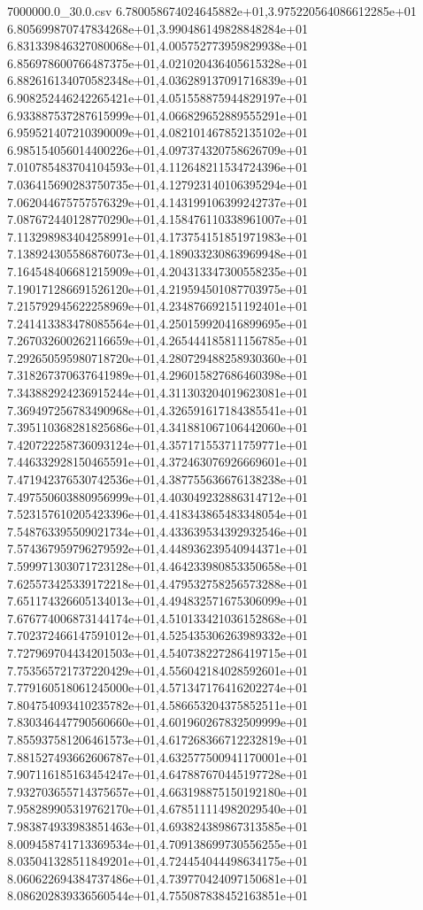 \begin{filecontents*}{7000000.0_30.0.csv}
6.780058674024645882e+01,3.975220564086612285e+01
6.805699870747834268e+01,3.990486149828848284e+01
6.831339846327080068e+01,4.005752773959829938e+01
6.856978600766487375e+01,4.021020436405615328e+01
6.882616134070582348e+01,4.036289137091716839e+01
6.908252446242265421e+01,4.051558875944829197e+01
6.933887537287615999e+01,4.066829652889555291e+01
6.959521407210390009e+01,4.082101467852135102e+01
6.985154056014400226e+01,4.097374320758626709e+01
7.010785483704104593e+01,4.112648211534724396e+01
7.036415690283750735e+01,4.127923140106395294e+01
7.062044675757576329e+01,4.143199106399242737e+01
7.087672440128770290e+01,4.158476110338961007e+01
7.113298983404258991e+01,4.173754151851971983e+01
7.138924305586876073e+01,4.189033230863969948e+01
7.164548406681215909e+01,4.204313347300558235e+01
7.190171286691526120e+01,4.219594501087703975e+01
7.215792945622258969e+01,4.234876692151192401e+01
7.241413383478085564e+01,4.250159920416899695e+01
7.267032600262116659e+01,4.265444185811156785e+01
7.292650595980718720e+01,4.280729488258930360e+01
7.318267370637641989e+01,4.296015827686460398e+01
7.343882924236915244e+01,4.311303204019623081e+01
7.369497256783490968e+01,4.326591617184385541e+01
7.395110368281825686e+01,4.341881067106442060e+01
7.420722258736093124e+01,4.357171553711759771e+01
7.446332928150465591e+01,4.372463076926669601e+01
7.471942376530742536e+01,4.387755636676138238e+01
7.497550603880956999e+01,4.403049232886314712e+01
7.523157610205423396e+01,4.418343865483348054e+01
7.548763395509021734e+01,4.433639534392932546e+01
7.574367959796279592e+01,4.448936239540944371e+01
7.599971303071723128e+01,4.464233980853350658e+01
7.625573425339172218e+01,4.479532758256573288e+01
7.651174326605134013e+01,4.494832571675306099e+01
7.676774006873144174e+01,4.510133421036152868e+01
7.702372466147591012e+01,4.525435306263989332e+01
7.727969704434201503e+01,4.540738227286419715e+01
7.753565721737220429e+01,4.556042184028592601e+01
7.779160518061245000e+01,4.571347176416202274e+01
7.804754093410235782e+01,4.586653204375852511e+01
7.830346447790560660e+01,4.601960267832509999e+01
7.855937581206461573e+01,4.617268366712232819e+01
7.881527493662606787e+01,4.632577500941170001e+01
7.907116185163454247e+01,4.647887670445197728e+01
7.932703655714375657e+01,4.663198875150192180e+01
7.958289905319762170e+01,4.678511114982029540e+01
7.983874933983851463e+01,4.693824389867313585e+01
8.009458741713369534e+01,4.709138699730556255e+01
8.035041328511849201e+01,4.724454044498634175e+01
8.060622694384737486e+01,4.739770424097150681e+01
8.086202839336560544e+01,4.755087838452163851e+01

\end{filecontents*}
